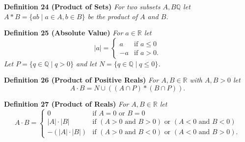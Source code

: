 \documentclass{article}
\begin{document}
\begin{flushleft}
\textbf{Definition 24 (Product of Sets)}
\textsl{For two subsets $A, B \mathbb{Q}$ let $A * B = \{ab \mid a \in A, b \in B\}$ be the product of $A$ and $B$.}
\newline

\textbf{Definition 25 (Absolute Value)}
\textsl{For $a \in \mathbb{R}$ let
\[
|a|=
\begin{cases}
a & \text{if } a \leq 0 \\
-a & \text{if } a >0.
\end{cases}
\]
Let $P=\{q \in \mathbb{Q} \mid q > 0\}$ and let $N=\{q \in \mathbb{Q} \mid q \leq 0\}$.}
\newline

\textbf{Definition 26 (Product of Positive Reals)}
\textsl{For $A, B \in \mathbb{R}$ with $A,B > 0$ let
\[
A \cdot B = N \cup ((A \cap P) * (B \cap P)).
\]}

\textbf{Definition 27 (Product of Reals)}
\textsl{For $A, B \in \mathbb{R}$ let
\[
A \cdot B=
\begin{cases}
0 & \text{if } A=0 \text{ or } B=0 \\
|A| \cdot |B| & \text{if } (A>0 \text{ and } B>0) \text{ or } (A<0 \text{ and } B<0) \\
-(|A| \cdot |B|) & \text{if } (A>0 \text{ and } B<0) \text{ or } (A<0 \text{ and } B>0).
\end{cases}
\]}
\newline


\end{flushleft}
\end{document}
